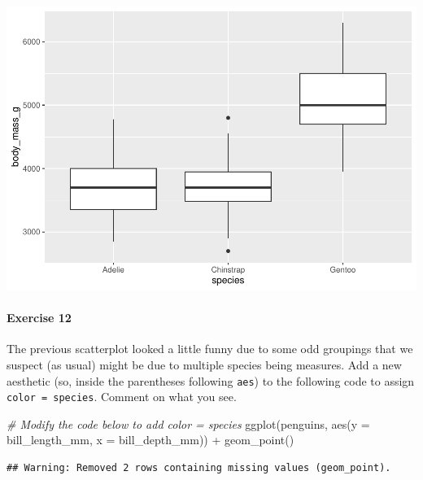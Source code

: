 \documentclass[
]{book}
\newenvironment{Shaded}{\begin{snugshade}}{\end{snugshade}}
\newcommand{\AttributeTok}[1]{\textcolor[rgb]{0.77,0.63,0.00}{#1}}
\newcommand{\CommentTok}[1]{\textcolor[rgb]{0.56,0.35,0.01}{\textit{#1}}}
\newcommand{\FunctionTok}[1]{\textcolor[rgb]{0.00,0.00,0.00}{#1}}
\newcommand{\NormalTok}[1]{#1}
\newcommand{\SpecialCharTok}[1]{\textcolor[rgb]{0.00,0.00,0.00}{#1}}
\begin{document}
\includegraphics{intro_stats_files/figure-latex/unnamed-chunk-115-1.pdf}

\hypertarget{exercise-12-1}{%
\paragraph*{Exercise 12}\label{exercise-12-1}}

The previous scatterplot looked a little funny due to some odd groupings that we suspect (as usual) might be due to multiple species being measures. Add a new aesthetic (so, inside the parentheses following \texttt{aes}) to the following code to assign \texttt{color\ =\ species}. Comment on what you see.

\begin{Shaded}
\begin{Highlighting}[]
\CommentTok{\# Modify the code below to add color = species}
\FunctionTok{ggplot}\NormalTok{(penguins, }\FunctionTok{aes}\NormalTok{(}\AttributeTok{y =}\NormalTok{ bill\_length\_mm, }\AttributeTok{x =}\NormalTok{ bill\_depth\_mm)) }\SpecialCharTok{+}
    \FunctionTok{geom\_point}\NormalTok{()}
\end{Highlighting}
\end{Shaded}

\begin{verbatim}
## Warning: Removed 2 rows containing missing values (geom_point).
\end{verbatim}
\end{document}
